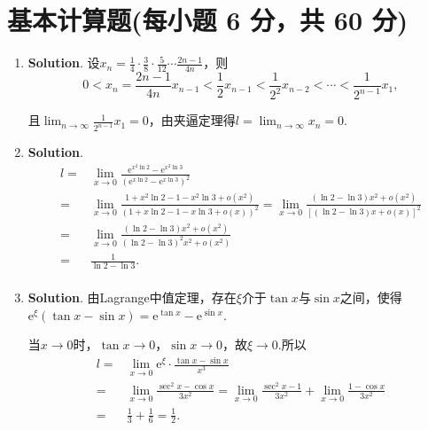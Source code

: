 \documentclass[../Main.tex]{subfiles}
\begin{document}
\section{基本计算题(每小题 6 分，共 60 分)}
\begin{enumerate}
    \item \textbf{Solution}. 设$x_{n}=\frac{1}{4}\cdot\frac{3}{8}\cdot\frac{5}{12}
              \cdots\frac{2n-1}{4n}$，则
          \[
              0<x_{n}=\frac{2n-1}{4n}x_{n-1}<\frac{1}{2}x_{n-1}<\frac{1}{2^{2}}x_{n-2}<
              \cdots<\frac{1}{2^{n-1}}x_{1},
          \]

          且$\lim_{n\to\infty}\frac{1}{2^{n-1}}x_{1}=0$，由夹逼定理得$l=\lim_{n\to\infty}
              x_{n}=0$.

    \item \textbf{Solution}.
          \[
              \begin{aligned}
                  l = & \lim_{x\to 0}\frac{\mathrm{e}^{x^2\ln 2}-\mathrm{e}^{x^2\ln 3}}{\left(\mathrm{e}^{x\ln 2}-\mathrm{e}^{x\ln 3}\right)^2}                                                   \\
                  =   & \lim_{x\to0}\frac{1+x^2\ln 2-1-x^2\ln 3+o(x^2)}{\left(1+x\ln 2-1-x\ln 3+o(x)\right)^2}=\lim_{x\to0}\frac{(\ln 2 - \ln 3)x^2+o(x^2)}{\left[(\ln 2 - \ln 3)x+o(x)\right]^2} \\
                  =   & \lim_{x\to0}\frac{(\ln 2-\ln 3)x^2+o(x^2)}{(\ln 2-\ln 3)^2x^2+o(x^2)}                                                                                                     \\
                  =   & \frac{1}{\ln 2-\ln 3}.                                                                                                                                                    \\
              \end{aligned}
          \]

    \item \textbf{Solution}. 由Lagrange中值定理，存在$\xi$介于$\tan x$与$\sin x$之间，使得$\mathrm{e}
              ^{\xi}(\tan x-\sin x)=\mathrm{e}^{\tan x}-\mathrm{e}^{\sin x}$.

          当$x\to0$时，$\tan x\to0$，$\sin x\to0$，故$\xi\to0$.所以
          \[
              \begin{aligned}
                  l= & \lim_{x\to0}\mathrm{e}^{\xi}\cdot\frac{\tan x-\sin x}{x^3}                                                      \\
                  =  & \lim_{x\to0}\frac{\sec^2 x-\cos x}{3x^2}=\lim_{x\to0}\frac{\sec^2 x- 1}{3x^2}+\lim_{x\to0}\frac{1-\cos x}{3x^2} \\
                  =  & \frac{1}{3}+\frac{1}{6}=\frac{1}{2}.
              \end{aligned}
          \]


\end{enumerate}
\end{document}
